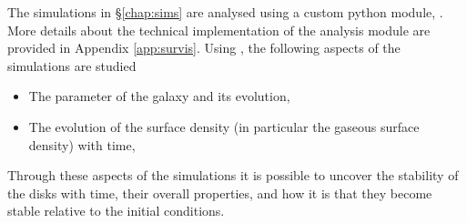 The simulations in \S\ref{chap:sims} are analysed using a custom python module, \sv. 
More details about the technical implementation of the analysis module are provided in Appendix \ref{app:survis}.
Using \sv, the following aspects of the simulations are studied
\begin{itemize}
\item The \citet{toomre_gravitational_1964} parameter of the galaxy and its evolution,
\item The evolution of the surface density (in particular the gaseous surface density) with time,
\end{itemize}
Through these aspects of the simulations it is possible to uncover the stability of the disks with time, their overall properties, and how it is that they become stable relative to the initial conditions.
